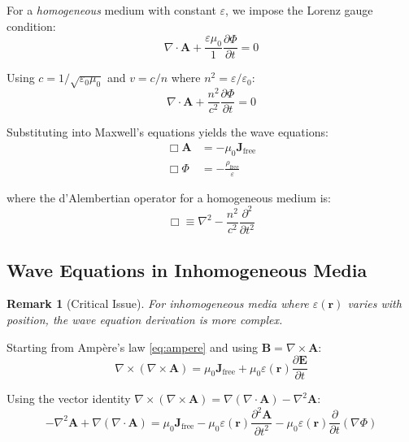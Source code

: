 \documentclass[12pt,a4paper]{article}
\newtheorem{remark}{Remark}
\begin{document}
For a \textit{homogeneous} medium with constant $\varepsilon$, we impose the Lorenz gauge condition:
\begin{equation}
\nabla \cdot \mathbf{A} + \frac{\varepsilon \mu_0}{1} \frac{\partial \Phi}{\partial t} = 0 \label{eq:lorenz_homo}
\end{equation}

Using $c = 1/\sqrt{\varepsilon_0 \mu_0}$ and $v = c/n$ where $n^2 = \varepsilon/\varepsilon_0$:
\begin{equation}
\nabla \cdot \mathbf{A} + \frac{n^2}{c^2} \frac{\partial \Phi}{\partial t} = 0 \label{eq:lorenz_homo_n}
\end{equation}

Substituting into Maxwell's equations yields the wave equations:
\begin{align}
\Box \mathbf{A} &= -\mu_0 \mathbf{J}_{\text{free}} \label{eq:wave_A_homo}\\
\Box \Phi &= -\frac{\rho_{\text{free}}}{\varepsilon} \label{eq:wave_Phi_homo}
\end{align}

where the d'Alembertian operator for a homogeneous medium is:
\begin{equation}
\Box \equiv \nabla^2 - \frac{n^2}{c^2} \frac{\partial^2}{\partial t^2} \label{eq:dalembertian}
\end{equation}

\subsection{Wave Equations in Inhomogeneous Media}

\begin{remark}[Critical Issue]
For \textit{inhomogeneous} media where $\varepsilon(\mathbf{r})$ varies with position, the wave equation derivation is more complex.
\end{remark}

Starting from Ampère's law \eqref{eq:ampere} and using $\mathbf{B} = \nabla \times \mathbf{A}$:
\begin{equation}
\nabla \times (\nabla \times \mathbf{A}) = \mu_0 \mathbf{J}_{\text{free}} + \mu_0 \varepsilon(\mathbf{r}) \frac{\partial \mathbf{E}}{\partial t}
\end{equation}

Using the vector identity $\nabla \times (\nabla \times \mathbf{A}) = \nabla(\nabla \cdot \mathbf{A}) - \nabla^2 \mathbf{A}$:
\begin{equation}
-\nabla^2 \mathbf{A} + \nabla(\nabla \cdot \mathbf{A}) = \mu_0 \mathbf{J}_{\text{free}} - \mu_0 \varepsilon(\mathbf{r}) \frac{\partial^2 \mathbf{A}}{\partial t^2} - \mu_0 \varepsilon(\mathbf{r}) \frac{\partial}{\partial t}(\nabla \Phi)
\end{equation}
\end{document}
